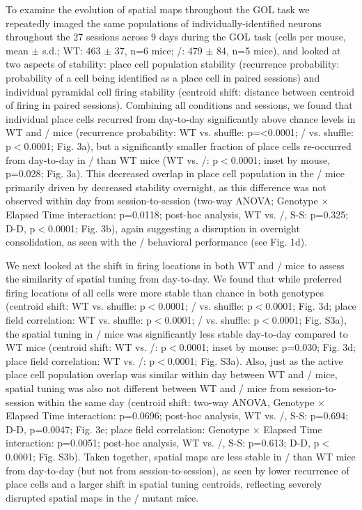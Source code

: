 To examine the evolution of spatial maps throughout the GOL task we repeatedly imaged the same populations of individually-identified neurons throughout the 27 sessions across 9 days during the GOL task (cells per mouse, mean $\pm$ s.d.; WT: 463 $\pm$ 37, n=6 mice; \df/: 479 $\pm$ 84, n=5 mice), and looked at two aspects of stability: place cell population stability (recurrence probability: probability of a cell being identified as a place cell in paired sessions) and individual pyramidal cell firing stability (centroid shift: distance between centroid of firing in paired sessions). Combining all conditions and sessions, we found that individual place cells recurred \citep{Ziv2013} from day-to-day significantly above chance levels in WT and \df/ mice (recurrence probability: WT vs. shuffle: p=<0.0001; \df/ vs. shuffle: p$<$0.0001; Fig. 3a), but a significantly smaller fraction of place cells re-occurred from day-to-day in \df/ than WT mice (WT vs. \df/: p$<$0.0001; inset by mouse, p=0.028; Fig. 3a). This decreased overlap in place cell population in the \df/ mice primarily driven by decreased stability overnight, as this difference was not observed within day from session-to-session (two-way ANOVA; Genotype $\times$ Elapsed Time interaction: p=0.0118; post-hoc analysis, WT vs. \df/, S-S: p=0.325; D-D, p$<$0.0001; Fig. 3b), again suggesting a disruption in overnight consolidation, as seen with the \df/ behavioral performance (see Fig. 1d).

We next looked at the shift in firing locations in both WT and \df/ mice to assess the similarity of spatial tuning from day-to-day. We found that while preferred firing locations of all cells were more stable than chance in both genotypes (centroid shift: WT vs. shuffle: p$<$0.0001; \df/ vs. shuffle: p$<$0.0001; Fig. 3d; place field correlation: WT vs. shuffle: p$<$0.0001; \df/ vs. shuffle: p$<$0.0001; Fig. S3a), the spatial tuning in \df/ mice was significantly less stable day-to-day compared to WT mice (centroid shift: WT vs. \df/: p$<$0.0001; inset by mouse: p=0.030; Fig. 3d; place field correlation: WT vs. \df/: p$<$0.0001; Fig. S3a). Also, just as the active place cell population overlap was similar within day between WT and \df/ mice, spatial tuning was also not different between WT and \df/ mice from session-to-session within the same day (centroid shift: two-way ANOVA, Genotype $\times$ Elapsed Time interaction: p=0.0696; post-hoc analysis, WT vs. \df/, S-S: p=0.694; D-D, p=0.0047; Fig. 3e; place field correlation: Genotype $\times$ Elapsed Time interaction: p=0.0051; post-hoc analysis, WT vs. \df/, S-S: p=0.613; D-D, p$<$0.0001; Fig. S3b). Taken together, spatial maps are less stable in \df/ than WT mice from day-to-day (but not from session-to-session), as seen by lower recurrence of place cells and a larger shift in spatial tuning centroids, reflecting severely disrupted spatial maps in the \df/ mutant mice.

